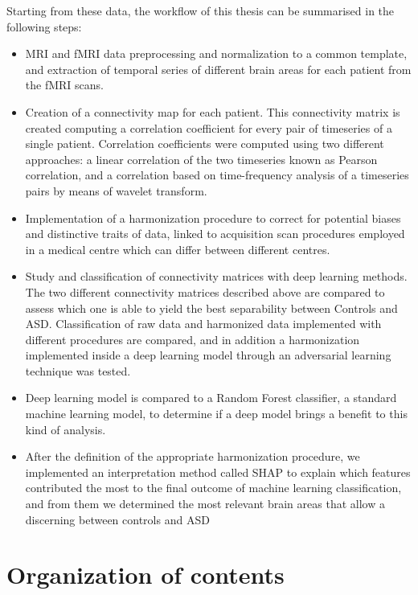 \documentclass[11pt]{report}
\begin{document}
Starting from these data, the workflow of this thesis can be summarised in the following steps:

\begin{itemize}
\item MRI and fMRI data preprocessing and normalization to a common template, and extraction of temporal series of different brain areas for each patient from the fMRI scans.
\item Creation of a connectivity map for each patient. This connectivity matrix is created computing a correlation coefficient for every pair of timeseries of a single patient. Correlation coefficients were computed using two different approaches: a linear correlation of the two timeseries known as Pearson correlation, and a correlation based on time-frequency analysis of a timeseries pairs by means of wavelet transform.
\item Implementation of a harmonization procedure to correct for potential biases and distinctive traits of data, linked to acquisition scan procedures employed in a medical centre which can differ between different centres.
\item Study and classification of connectivity matrices with deep learning methods. The two different connectivity matrices described above are compared to assess which one is able to yield the best separability between Controls and ASD.
Classification of raw data and harmonized data implemented with different procedures are compared, and in addition a harmonization implemented inside a deep learning model through an adversarial learning technique was tested.
\item Deep learning model is compared to a Random Forest classifier, a standard machine learning model, to determine if a deep model brings a benefit to this kind of analysis.
\item After the definition of the appropriate harmonization procedure, we implemented an interpretation method called SHAP to explain which features contributed the most to the final outcome of machine learning classification, and from them we determined the most relevant brain areas that allow a discerning between controls and ASD
\end{itemize}

\chapter*{Organization of contents}
\end{document}
